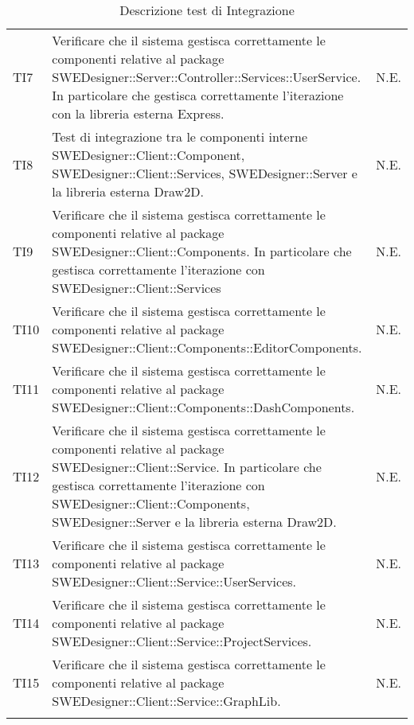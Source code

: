 \begin{longtable}{p{2cm}!{\VRule[1pt]}p{10cm}!{\VRule[1pt]}p{1cm}}
TI7 & Verificare che il sistema gestisca correttamente le componenti relative al package SWEDesigner::Server::Controller::Services::UserService. In particolare che gestisca correttamente l'iterazione con la libreria esterna Express. & N.E.\\

TI8 & Test di integrazione tra le componenti interne SWEDesigner::Client::Component, SWEDesigner::Client::Services, SWEDesigner::Server e la libreria esterna Draw2D. & N.E.\\

TI9 & Verificare che il sistema gestisca correttamente le componenti relative al package SWEDesigner::Client::Components. In particolare che gestisca correttamente l'iterazione con SWEDesigner::Client::Services & N.E.\\

TI10 & Verificare che il sistema gestisca correttamente le componenti relative al package SWEDesigner::Client::Components::EditorComponents. & N.E.\\

TI11 & Verificare che il sistema gestisca correttamente le componenti relative al package SWEDesigner::Client::Components::DashComponents. & N.E.\\

TI12 & Verificare che il sistema gestisca correttamente le componenti relative al package SWEDesigner::Client::Service. In particolare che gestisca correttamente l'iterazione con SWEDesigner::Client::Components, SWEDesigner::Server e la libreria esterna Draw2D. & N.E.\\

TI13 & Verificare che il sistema gestisca correttamente le componenti relative al package SWEDesigner::Client::Service::UserServices. & N.E.\\

TI14 & Verificare che il sistema gestisca correttamente le componenti relative al package SWEDesigner::Client::Service::ProjectServices. & N.E.\\

TI15 & Verificare che il sistema gestisca correttamente le componenti relative al package SWEDesigner::Client::Service::GraphLib. & N.E.\\

\caption{Descrizione test di Integrazione}
\end{longtable}


